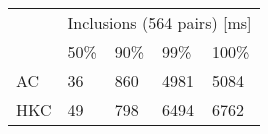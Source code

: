 \begin{tabular}{l|llll}
\multirow{2}{*}{} & \multicolumn{4}{c}{Inclusions (564 pairs) {[}ms{]}} \\ \cline{2-5}
                  & 50\%   & 90\%    & 99\%    & 100\%   \\ \hline
AC                & 36     & 860     & 4981    & 5084    \\
HKC               & 49     & 798     & 6494    & 6762    \\
\end{tabular}
